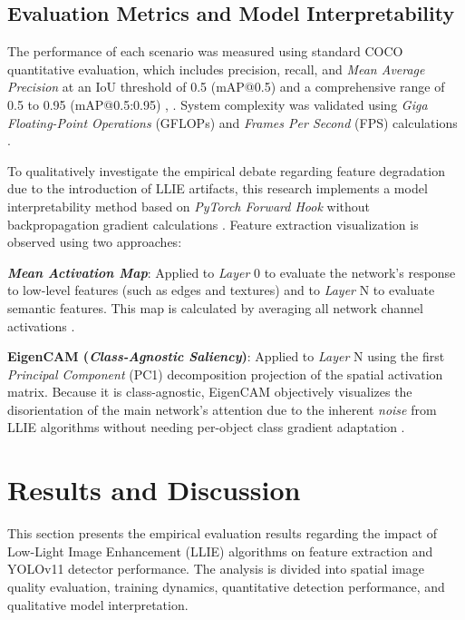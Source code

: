 \documentclass[conference]{IEEEtran}
\begin{document}
\subsection{Evaluation Metrics and Model Interpretability} The performance of each scenario was measured using standard COCO quantitative evaluation, which includes precision, recall, and \textit{Mean Average Precision} at an IoU threshold of 0.5 (mAP@0.5) and a comprehensive range of 0.5 to 0.95 (mAP@0.5:0.95) \cite{report2026internal}, \cite{metrics2026formulas}. System complexity was validated using \textit{Giga Floating-Point Operations} (GFLOPs) and \textit{Frames Per Second} (FPS) calculations \cite{metrics2026formulas}.

To qualitatively investigate the empirical debate regarding feature degradation due to the introduction of LLIE artifacts, this research implements a model interpretability method based on \textit{PyTorch Forward Hook} without backpropagation gradient calculations \cite{metrics2026formulas}. Feature extraction visualization is observed using two approaches:

\textbf{\textit{Mean Activation Map}}: Applied to \textit{Layer} 0 to evaluate the network's response to low-level features (such as edges and textures) and to \textit{Layer} N to evaluate semantic features. This map is calculated by averaging all network channel activations \cite{metrics2026formulas}.

\textbf{EigenCAM (\textit{Class-Agnostic Saliency})}: Applied to \textit{Layer} N using the first \textit{Principal Component} (PC1) decomposition projection of the spatial activation matrix. Because it is class-agnostic, EigenCAM objectively visualizes the disorientation of the main network's attention due to the inherent \textit{noise} from LLIE algorithms without needing per-object class gradient adaptation \cite{metrics2026formulas}.


\section{Results and Discussion}
This section presents the empirical evaluation results regarding the impact of Low-Light Image Enhancement (LLIE) algorithms on feature extraction and YOLOv11 detector performance. The analysis is divided into spatial image quality evaluation, training dynamics, quantitative detection performance, and qualitative model interpretation.
\end{document}
